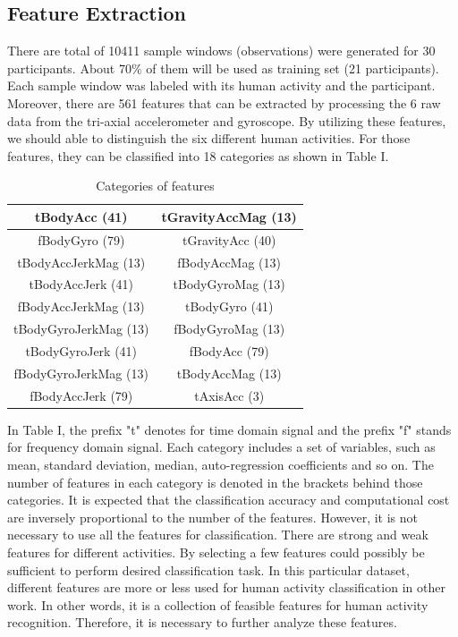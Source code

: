 \documentclass[conference]{IEEEtran}
\begin{document}
\subsection{Feature Extraction}
There are total of 10411 sample windows (observations) were generated for 30 participants. About 70$\%$ of them will be used as training set (21 participants). Each sample window was labeled with its human activity and the participant. Moreover, there are 561 features that can be extracted by processing the 6 raw data from the tri-axial accelerometer and gyroscope. By utilizing these features, we should able to distinguish the six different human activities. For those features, they can be classified into 18 categories as shown in Table I.

\begin{table}[htbp]
\renewcommand{\arraystretch}{1.3}
\caption{Categories of features}
\label{Categories of features}
\centering
\begin{tabular}{|c||c|}
\hline
tBodyAcc (41)&tGravityAccMag (13) \\
\hline
fBodyGyro (79)& tGravityAcc (40) \\
\hline
tBodyAccJerkMag (13)&fBodyAccMag (13)\\
\hline
tBodyAccJerk (41)&tBodyGyroMag (13) \\
\hline
fBodyAccJerkMag (13)& tBodyGyro (41) \\
\hline
tBodyGyroJerkMag (13)& fBodyGyroMag (13)\\
\hline
tBodyGyroJerk (41)& fBodyAcc (79) \\
\hline
fBodyGyroJerkMag (13)& tBodyAccMag (13)\\
\hline
fBodyAccJerk (79)& tAxisAcc (3)\\
\hline
\end{tabular}
\end{table}
					
In Table I, the prefix "t" denotes for time domain signal and the prefix "f" stands for frequency domain signal. Each category includes a set of variables, such as mean, standard deviation, median, auto-regression coefficients and so on. The number of features in each category is denoted in the brackets behind those categories. It is expected that the classification accuracy and computational cost are inversely proportional to the number of the features. However, it is not necessary to use all the features for classification. There are strong and weak features for different activities. By selecting a few features could possibly be sufficient to perform desired classification task. In this particular dataset, different features are more or less used for human activity classification in other work. In other words, it is a collection of feasible features for human activity recognition. Therefore, it is necessary to further analyze these features.
\end{document}
